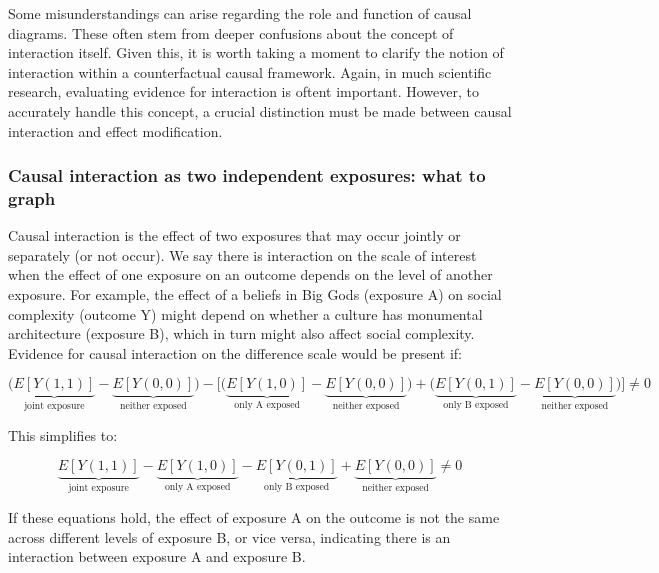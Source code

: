 \documentclass[
  singlecolumn]{report}
\begin{document}
Some misunderstandings can arise regarding the role and function of
causal diagrams. These often stem from deeper confusions about the
concept of interaction itself. Given this, it is worth taking a moment
to clarify the notion of interaction within a counterfactual causal
framework. Again, in much scientific research, evaluating evidence for
interaction is oftent important. However, to accurately handle this
concept, a crucial distinction must be made between causal interaction
and effect modification.

\hypertarget{causal-interaction-as-two-independent-exposures-what-to-graph}{%
\subsubsection{\texorpdfstring{\textbf{Causal interaction as two
independent exposures: what to
graph}}{Causal interaction as two independent exposures: what to graph}}\label{causal-interaction-as-two-independent-exposures-what-to-graph}}

Causal interaction is the effect of two exposures that may occur jointly
or separately (or not occur). We say there is interaction on the scale
of interest when the effect of one exposure on an outcome depends on the
level of another exposure. For example, the effect of a beliefs in Big
Gods (exposure A) on social complexity (outcome Y) might depend on
whether a culture has monumental architecture (exposure B), which in
turn might also affect social complexity. Evidence for causal
interaction on the difference scale would be present if:

\[\bigg(\underbrace{E[Y(1,1)]}_{\text{joint exposure}} - \underbrace{E[Y(0,0)]}_{\text{neither exposed}}\bigg) - \bigg[ \bigg(\underbrace{E[Y(1,0)]}_{\text{only A exposed}} - \underbrace{E[Y(0,0)]}_{\text{neither exposed}}\bigg) + \bigg(\underbrace{E[Y(0,1)]}_{\text{only B exposed}} - \underbrace{E[Y(0,0)]}_{\text{neither exposed}} \bigg)\bigg] \neq 0 \]

This simplifies to:

\[ \underbrace{E[Y(1,1)]}_{\text{joint exposure}} - \underbrace{E[Y(1,0)]}_{\text{only A exposed}} - \underbrace{E[Y(0,1)]}_{\text{only B exposed}} + \underbrace{E[Y(0,0)]}_{\text{neither exposed}} \neq 0 \]

If these equations hold, the effect of exposure A on the outcome is not
the same across different levels of exposure B, or vice versa,
indicating there is an interaction between exposure A and exposure B.
\end{document}
